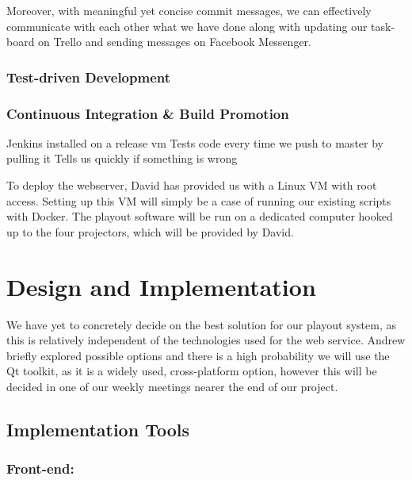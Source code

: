 ﻿\documentclass[a4paper, titlepage]{article}
\begin{document}
Moreover, with meaningful yet concise commit messages, we can effectively
communicate with each other what we have done along with updating our task-board
on Trello and sending messages on Facebook Messenger.


\subsubsection{Test-driven Development} \label{sec:projman_tdd}


\subsubsection{Continuous Integration \& Build Promotion}
Jenkins installed on a release vm
Tests code every time we push to master by pulling it
Tells us quickly if something is wrong



To deploy the webserver, David has provided us with a Linux VM with root access. Setting up this VM will simply be a case of running our existing scripts with Docker. The playout software will be run on a dedicated computer hooked up to the four projectors, which will be provided by David. 

\newpage
\section{Design and Implementation}




We have yet to concretely decide on the best solution for our playout system, as this is relatively independent of the technologies used for the web service. Andrew briefly explored possible options and there is a high probability we will use the Qt toolkit, as it is a widely used, cross-platform option, however this will be decided in one of our weekly meetings nearer the end of our project.

\subsection{Implementation Tools}

\subsubsection{Front-end: }
\end{document}
